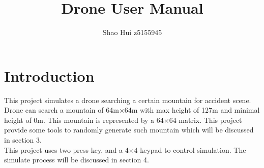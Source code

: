 \documentclass[a4paper, 12 pt]{report}
\begin{document}
\title{Drone User Manual}
\author{Shao Hui z5155945}
\date{}
\maketitle
\pagestyle{empty}
\setcounter{section}{0}
\tableofcontents
\newpage

\section{Introduction}
This project simulates a drone searching a certain mountain for accident scene.\\
Drone can search a mountain of 64m$\times$64m with max height of 127m and minimal height of 0m. This mountain is represented by a 64$\times$64 matrix. This project provide some tools to randomly generate such mountain which will be discussed in section 3.\\
This project uses two press key, and a 4$\times$4 keypad to control simulation. The simulate process will be discussed in section 4.
\newpage

\end{document}
